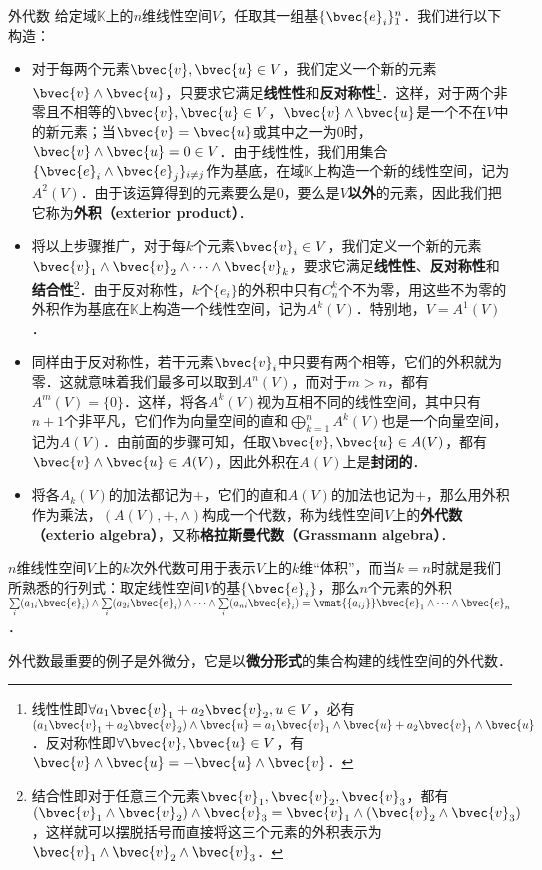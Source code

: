 \begin{example}{外代数}\label{AlgFie_ex1}
给定域$\mathbb{K}$上的$n$维线性空间$V$，任取其一组基$\{\bvec{e}_i\}^n_{1}$．我们进行以下构造：
\begin{itemize}
\item 对于每两个元素$\bvec{v}, \bvec{u}\in V$，我们定义一个新的元素$\bvec{v}\wedge \bvec{u}$，只要求它满足\textbf{线性性}和\textbf{反对称性}\footnote{线性性即$\forall a_1\bvec{v}_1+a_2\bvec{v}_2,{u}\in V$，必有$(a_1\bvec{v}_1+a_2\bvec{v}_2)\wedge\bvec{u}=a_1\bvec{v}_1\wedge\bvec{u}+a_2\bvec{v}_1\wedge\bvec{u}$．反对称性即$\forall \bvec{v}, \bvec{u}\in V$，有$\bvec{v}\wedge\bvec{u}=-\bvec{u}\wedge\bvec{v}$．}．这样，对于两个非零且不相等的$\bvec{v},\bvec{u}\in V$，$\bvec{v}\wedge \bvec{u}$是一个不在$V$中的新元素；当$\bvec{v}=\bvec{u}$或其中之一为$0$时，$\bvec{v}\wedge \bvec{u}=0\in V$．由于线性性，我们用集合$\{\bvec{e}_i\wedge \bvec{e}_j\}_{i\not=j}$作为基底，在域$\mathbb{K}$上构造一个新的线性空间，记为$A^2(V)$．由于该运算得到的元素要么是$0$，要么是$V$\textbf{以外}的元素，因此我们把它称为\textbf{外积（exterior product）}．

\item 将以上步骤推广，对于每$k$个元素$\bvec{v}_i\in V$，我们定义一个新的元素$\bvec{v}_1\wedge \bvec{v}_2\wedge\cdots\wedge \bvec{v}_k$，要求它满足\textbf{线性性}、\textbf{反对称性}和\textbf{结合性}\footnote{结合性即对于任意三个元素$\bvec{v}_1,\bvec{v}_2,\bvec{v}_3$，都有$(\bvec{v}_1\wedge \bvec{v}_2)\wedge \bvec{v}_3=\bvec{v}_1\wedge(\bvec{v}_2\wedge \bvec{v}_3)$，这样就可以摆脱括号而直接将这三个元素的外积表示为$\bvec{v}_1\wedge \bvec{v}_2\wedge \bvec{v}_3$．}．由于反对称性，$k$个$\{e_i\}$的外积中只有$C^k_n$个不为零，用这些不为零的外积作为基底在$\mathbb{K}$上构造一个线性空间，记为$A^k(V)$．特别地，$V=A^1(V)$．

\item 同样由于反对称性，若干元素$\bvec{v}_i$中只要有两个相等，它们的外积就为零．这就意味着我们最多可以取到$A^n(V)$，而对于$m>n$，都有$A^m(V)=\{0\}$．这样，将各$A^k(V)$视为互相不同的线性空间，其中只有$n+1$个非平凡，它们作为向量空间的直和$\bigoplus\limits_{k=1}^n A^k(V)$也是一个向量空间，记为$A(V)$．由前面的步骤可知，任取$\bvec{v}, \bvec{u}\in A(V)$，都有$\bvec{v}\wedge\bvec{u}\in A(V)$，因此外积在$A(V)$上是\textbf{封闭的}．
\item 将各$A_k(V)$的加法都记为$+$，它们的直和$A(V)$的加法也记为$+$，那么用外积作为乘法，$(A(V), +, \wedge)$构成一个代数，称为线性空间$V$上的\textbf{外代数（exterio algebra）}，又称\textbf{格拉斯曼代数（Grassmann algebra）}．
\end{itemize}

\end{example}

$n$维线性空间$V$上的$k$次外代数可用于表示$V$上的$k$维“体积”，而当$k=n$时就是我们所熟悉的行列式：取定线性空间$V$的基$\{\bvec{e}_i\}$，那么$n$个元素的外积$\sum\limits_{i}(a_{1i}\bvec{e}_i)\wedge\sum\limits_{i}(a_{2i}\bvec{e}_i)\wedge\cdots\wedge\sum\limits_{i}(a_{ni}\bvec{e}_i)=\vmat{\{a_{ij}\}}\bvec{e}_1\wedge\cdots\wedge\bvec{e}_n$．

外代数最重要的例子是外微分，它是以\textbf{微分形式}的集合构建的线性空间的外代数．

